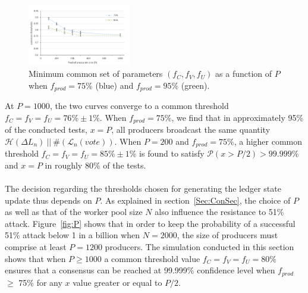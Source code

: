 \begin{figure}
 \vspace{-1.5cm}
 \begin{center}
   \includegraphics[width=0.4\textwidth]{Figures/tree_summary_p200t1000.png}
 \end{center}
 \vspace{-0.6cm}
  \caption{Minimum common set of parameters $(f_C, f_V, f_U)$ as a function of $P$ when $f_{prod} = 75\%$ (blue) and $f_{prod} = 95\%$ (green).}
   \label{fig:treeSum}
\end{figure}

At $P=1000$, the two curves converge to a common threshold $f_C=f_V=f_U=76\% \pm 1\%$. When $f_{prod} = 75\%$, we find that in approximately 95\% of the conducted tests, $x=P$, all producers broadcast the same quantity $\mathcal{H}(\Delta L_n)~||~\#(\mathcal{L}_{n}(vote))$. When $P=200$ and $f_{prod} = 75\%$, a higher common threshold $f_C = f_V = f_U = 85\% \pm 1\%$ is found to satisfy $\mathcal{P}(x>P/2) > 99.999\%$ and $x=P$ in roughly 80\% of the tests.\\
\\
The decision regarding the thresholds  chosen for generating the ledger state update thus depends on $P$. As explained in section~\ref{Sec:ConSec}, the choice of $P$ as well as that of the worker pool size $N$ also influence the resistance to 51\% attack. Figure~\ref{fig:P} shows that in order to keep the probability of a successful 51\% attack below 1 in a billion when $N=2000$, the size of producers must comprise at least $P=1200$ producers. The simulation conducted in this section shows that when $P \geq 1000$ a common threshold value $f_C = f_V = f_U = 80\%$ ensures that a consensus can be reached at 99.999\% confidence level when $f_{prod}$ $\geq$ 75\% for any $x$ value greater or equal to $P/2$.


